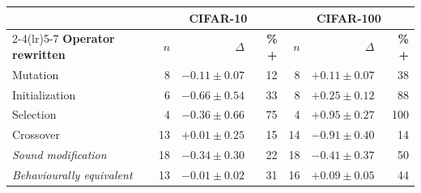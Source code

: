 \begin{tabular}{l rrr rrr}
\toprule
& \multicolumn{3}{c}{CIFAR-10} & \multicolumn{3}{c}{CIFAR-100} \\
\cmidrule(lr){2-4}\cmidrule(lr){5-7}
\textbf{Operator rewritten} & $n$ & $\Delta$ & \textbf{\% +} & $n$ & $\Delta$ & \textbf{\% +} \\
\midrule
Mutation & 8 & $-0.11\!\pm\!0.07$ & 12 & 8 & $+0.11\!\pm\!0.07$ & 38 \\
Initialization & 6 & $-0.66\!\pm\!0.54$ & 33 & 8 & $+0.25\!\pm\!0.12$ & 88 \\
Selection & 4 & $-0.36\!\pm\!0.66$ & 75 & 4 & $+0.95\!\pm\!0.27$ & 100 \\
Crossover & 13 & $+0.01\!\pm\!0.25$ & 15 & 14 & $-0.91\!\pm\!0.40$ & 14 \\
\midrule
\textit{Sound modification} & 18 & $-0.34\!\pm\!0.30$ & 22 & 18 & $-0.41\!\pm\!0.37$ & 50 \\
\textit{Behaviourally equivalent} & 13 & $-0.01\!\pm\!0.02$ & 31 & 16 & $+0.09\!\pm\!0.05$ & 44 \\
\bottomrule
\end{tabular}
